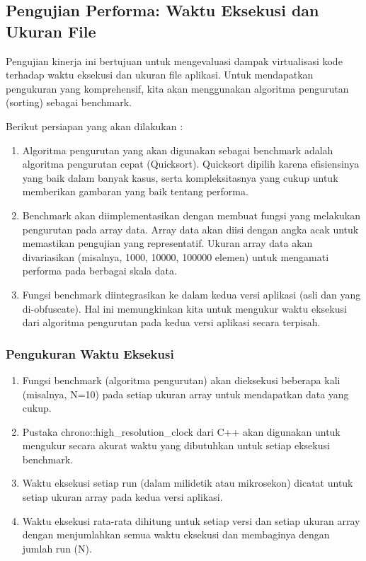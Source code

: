 \subsection{Pengujian Performa: Waktu Eksekusi dan Ukuran File}
Pengujian kinerja ini bertujuan untuk mengevaluasi dampak virtualisasi kode terhadap waktu eksekusi dan ukuran file aplikasi. Untuk mendapatkan pengukuran yang komprehensif, kita akan menggunakan algoritma pengurutan (sorting) sebagai benchmark.

Berikut persiapan yang akan dilakukan :
\begin{enumerate}
	\item {} Algoritma pengurutan yang akan digunakan sebagai benchmark adalah algoritma pengurutan cepat (Quicksort). Quicksort dipilih karena efisiensinya yang baik dalam banyak kasus, serta kompleksitasnya yang cukup untuk memberikan gambaran yang baik tentang performa.
	\item {} Benchmark akan diimplementasikan dengan membuat fungsi yang melakukan pengurutan pada array data. Array data akan diisi dengan angka acak untuk memastikan pengujian yang representatif. Ukuran array data akan divariasikan (misalnya, 1000, 10000, 100000 elemen) untuk mengamati performa pada berbagai skala data.
	\item {} Fungsi benchmark diintegrasikan ke dalam kedua versi aplikasi (asli dan yang di-obfuscate). Hal ini memungkinkan kita untuk mengukur waktu eksekusi dari algoritma pengurutan pada kedua versi aplikasi secara terpisah.
\end{enumerate}

\subsubsection{Pengukuran Waktu Eksekusi}
\begin{enumerate}
	\item {} Fungsi benchmark (algoritma pengurutan) akan dieksekusi beberapa kali (misalnya, N=10) pada setiap ukuran array untuk mendapatkan data yang cukup.
	\item {} Pustaka chrono::high\_resolution\_clock dari C++ akan digunakan untuk mengukur secara akurat waktu yang dibutuhkan untuk setiap eksekusi benchmark.
	\item {} Waktu eksekusi setiap run (dalam milidetik atau mikrosekon) dicatat untuk setiap ukuran array pada kedua versi aplikasi.
	\item {} Waktu eksekusi rata-rata dihitung untuk setiap versi dan setiap ukuran array dengan menjumlahkan semua waktu eksekusi dan membaginya dengan jumlah run (N).
\end{enumerate}

